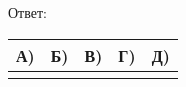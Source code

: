 
Ответ: \sepline \\
\begin{tabular}{|c|c|c|c|c|}
\hline
А) & Б) & В) & Г) & Д) \\
\hline
\makecell{} & \makecell{} & \makecell{} & \makecell{} & \makecell{}\\
\hline
\end{tabular}